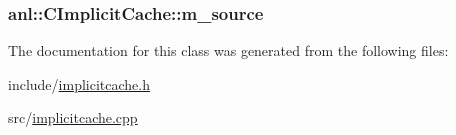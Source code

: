 \label{classanl_1_1CImplicitCache_a5c6e78d38a13997a42bfd1e5982be16b}
\hypertarget{classanl_1_1CImplicitCache_ae71fdfc62f638c3ccc085db64dd6979c}{
\subsubsection[{m\_\-source}]{ {\bf anl::CImplicitCache::m\_\-source}}}
\label{classanl_1_1CImplicitCache_ae71fdfc62f638c3ccc085db64dd6979c}


The documentation for this class was generated from the following files:\begin{DoxyCompactItemize}
\item 
include/\hyperlink{implicitcache_8h}{implicitcache.h}\item 
src/\hyperlink{implicitcache_8cpp}{implicitcache.cpp}\end{DoxyCompactItemize}
